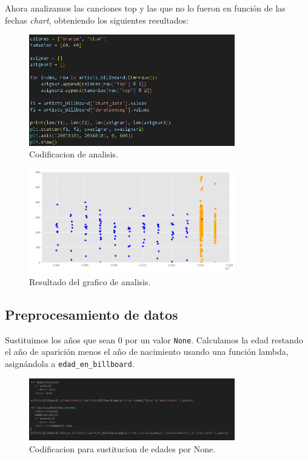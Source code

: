 \documentclass[a4paper,12pt]{article}
\begin{document}
Ahora analizamos las canciones top y las que no lo fueron en función de las fechas \textit{chart}, obteniendo los siguientes resultados:

\begin{figure}[H]
    \centering
    \includegraphics[width=0.8\textwidth]{12.png}
    \caption{Codificacion de analisis.}
\end{figure}

\begin{figure}[H]
    \centering
    \includegraphics[width=0.8\textwidth]{13.png}
    \caption{Resultado del grafico de analisis.}
\end{figure}

\subsection{Preprocesamiento de datos}
Sustituimos los años que sean 0 por un valor \texttt{None}. Calculamos la edad restando el año de aparición menos el año de nacimiento usando una función lambda, asignándola a \texttt{edad\_en\_billboard}.

\begin{figure}[H]
    \centering
    \includegraphics[width=0.8\textwidth]{14.png}
    \caption{Codificacion para sustitucion de edades por None.}
\end{figure}
\end{document}
